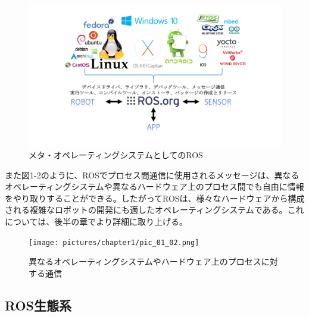 \begin{figure}[h]
  \centering
  \includegraphics[width=\columnwidth]{pictures/chapter1/pic_01_01.png}
  \caption{メタ・オペレーティングシステムとしてのROS}
\end{figure}


また図1-2のように、ROSでプロセス間通信に使用されるメッセージは、異なるオペレーティングシステムや異なるハードウェア上のプロセス間でも自由に情報をやり取りすることができる。したがってROSは、様々なハードウェアから構成される複雑なロボットの開発にも適したオペレーティングシステムである。これについては、後半の章でより詳細に取り上げる。

\begin{figure}[h]
  \centering
  \texttt{[image: pictures/chapter1/pic\_01\_02.png]}
  \caption{異なるオペレーティングシステムやハードウェア上のプロセスに対する通信}
\end{figure}

\subsection{ROS生態系}

